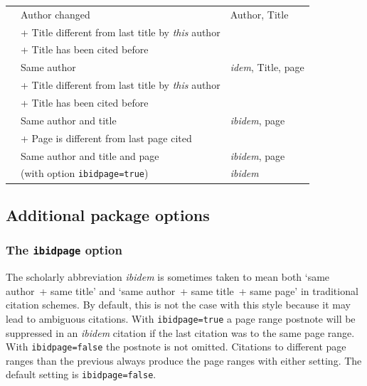 \documentclass[a4paper]{article}
\newenvironment*{inlinetable}
  {\trivlist\footnotesize\item}
  {\endtrivlist}
\newcommand*{\code}[1]{%
  \detokenize\expandafter{\string#1}}
\begin{document}
\begin{inlinetable}
\begin{tabularx}{\linewidth}{@{}VlX@{}}
\cmidrule(r){1-1}\cmidrule(lr){2-2}\cmidrule(l){3-3}
\code{\cite{a1}}        & Author changed        & Author, Title \\
                        & + Title different from last title by \emph{this} author \\
                        & + Title has been cited before \\
\cmidrule(r){1-1}\cmidrule(lr){2-2}\cmidrule(l){3-3}
\code{\cite[55]{a2}}    & Same author           & \emph{idem}, Title, page \\
                        & + Title different from last title by \emph{this} author \\
                        & + Title has been cited before \\
\cmidrule(r){1-1}\cmidrule(lr){2-2}\cmidrule(l){3-3}
\code{\cite[25]{a2}}    & Same author and title & \emph{ibidem}, page \\
                        & + Page is different from last page cited \\
\cmidrule(r){1-1}\cmidrule(lr){2-2}\cmidrule(l){3-3}
\code{\cite[25]{a2}}    & Same author and title and page
						& \emph{ibidem}, page \\
\code{\cite[25]{a2}}    & (with option \texttt{ibidpage=true})
						& \emph{ibidem} \\
\bottomrule
\end{tabularx}
\end{inlinetable}

\clearpage

\subsection*{Additional package options}

\subsubsection*{The \texttt{ibidpage} option}

The scholarly abbreviation \emph{ibidem} is sometimes taken to mean
both `same author~+ same title' and `same author~+ same title~+ same
page' in traditional citation schemes. By default, this is not the
case with this style because it may lead to ambiguous citations.
With \texttt{ibidpage=true} a page range postnote will be suppressed
in an \emph{ibidem} citation if the last citation was to the same
page range. With \texttt{ibidpage=false} the postnote is not omitted.
Citations to different page ranges than the previous always produce
the page ranges with either setting.
The default setting is \texttt{ibidpage=false}.
\end{document}
